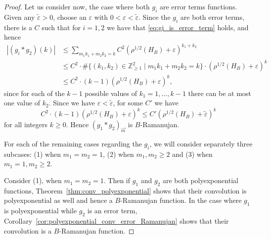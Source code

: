 \documentclass{memo-l}
\theoremstyle{plain}
\theoremstyle{definition}
\numberwithin{section}{chapter}
\numberwithin{equation}{chapter}
\newcommand{\rhoroot}[1]{\rho^{1/2}(H_{#1})}
\DeclareMathOperator{\error}{error}
\theoremstyle{plain}
\theoremstyle{definition}
\newcommand\ZZ{\mathbb{Z}}
\begin{document}
\begin{proof}
Let us consider now, the case where both \( g_i \) are error terms
functions. 
Given any $\widetilde\varepsilon>0$, choose an $\varepsilon$ with
$0<\varepsilon<\widetilde\varepsilon$.
Since the $g_i$ are both error terms,
there is a $C$ such that for $i=1,2$
we have that \eqref{eq:gi_is_error_term} holds, and hence
\begin{align*} | (g_i \ast g_2)(k) | &\leq
\sum_{m_1k_1+m_2k_2=k} C^2 (\rhoroot B + \varepsilon)^{k_1+k_2} \\ &\leq
C^2 \cdot \# \{ (k_1,k_2) \in \ZZ_{\geq 1}^2 \mid m_1k_1+m_2k_2=k \} \cdot
(\rhoroot B + \varepsilon)^k 
\\
& \le C^2 \cdot (k-1)
(\rhoroot B + \varepsilon)^k ,
\end{align*} 
since for each of the $k-1$ possible values of $k_1=1,\ldots,k-1$ there
can be at most one value of $k_2$.
Since we have $\varepsilon<\widetilde\varepsilon$, for some $C'$ we have
$$
C^2 \cdot (k-1)
(\rhoroot B + \varepsilon)^k 
\le C' 
(\rhoroot B + \widetilde\varepsilon)^k 
$$
for all integers $k\ge 0$.
Hence $(g_1 \ast g_2)_{\vec m}$ is $B$-Ramanujan. 
% 
% 

For each of the remaining
cases regarding the $g_i$, we will consider
separately three subcases: (1) when \(m_1=m_2=1\), (2) when
\(m_1,m_2 \geq 2\) and (3) when \(m_1=1, m_2 \geq 2 \).

Consider (1), when \(m_1=m_2=1\). Then if \( g_1\) and \(g_2\) are both
polyexponential functions, Theorem~\ref{thm:conv_polyexponential} shows
that their convolution is polyexponential as well and hence a
\(B\)-Ramanujan function. In the case where \( g_1 \) is polyexponential
while \( g_2 \) is an error term,
Corollary~\ref{cor:polyexponential_conv_error_Ramanujan} shows that their
convolution is a \(B\)-Ramanujan function.


\end{proof}
\end{document}
